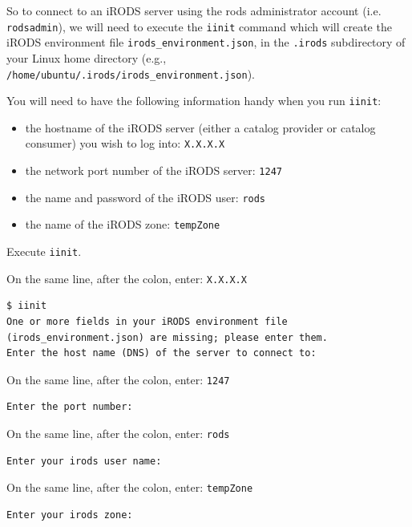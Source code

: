\documentclass[10pt,oneside]{memoir}
\begin{document}
So to connect to an iRODS server using the rods administrator account (i.e. \texttt{rodsadmin}), we will need to execute the \texttt{iinit} command which will create the iRODS environment file \texttt{irods\_environment.json}, in the \texttt{.irods} subdirectory of your Linux home directory (e.g., \texttt{/home/ubuntu/.irods/irods\_environment.json}).

\newpage

You will need to have the following information handy when you run \texttt{iinit}:
\begin{itemize}
 \item the hostname of the iRODS server (either a catalog provider or catalog consumer) you wish to log into: \texttt{X.X.X.X}
 \item the network port number of the iRODS server: \texttt{1247}
 \item the name and password of the iRODS user: \texttt{rods}
 \item the name of the iRODS zone: \texttt{tempZone}
\end{itemize}

Execute \texttt{iinit}.

On the same line, after the colon, enter: \texttt{X.X.X.X}

\begin{lstlisting}[basicstyle=\scriptsize\ttfamily]
$ iinit
One or more fields in your iRODS environment file (irods_environment.json) are missing; please enter them.
Enter the host name (DNS) of the server to connect to:
\end{lstlisting}

On the same line, after the colon, enter: \texttt{1247}

\begin{lstlisting}[basicstyle=\scriptsize\ttfamily]
Enter the port number:
\end{lstlisting}

On the same line, after the colon, enter: \texttt{rods}

\begin{lstlisting}[basicstyle=\scriptsize\ttfamily]
Enter your irods user name:
\end{lstlisting}

On the same line, after the colon, enter: \texttt{tempZone}

\begin{lstlisting}[basicstyle=\scriptsize\ttfamily]
Enter your irods zone:
\end{lstlisting}
\end{document}
